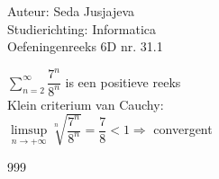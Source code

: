 \documentclass[a4paper]{article}
\begin{document}
\noindent \large Auteur: Seda Jusjajeva\\
\noindent \large Studierichting: Informatica\\
\noindent \large Oefeningenreeks 6D nr. 31.1\\

\medskip

\normalsize


$\displaystyle\sum\limits_{n = 2}^\infty\dfrac{7^n}{8^n}$ is een positieve reeks \\

Klein criterium van Cauchy: \\

$\limsup\limits_{n \to +\infty} \sqrt[n]{\dfrac{7^n}{8^n}} = \dfrac{7}{8} < 1 \Rightarrow$ convergent \\



\begin{thebibliography}{999}
\end{thebibliography}
\end{document}
